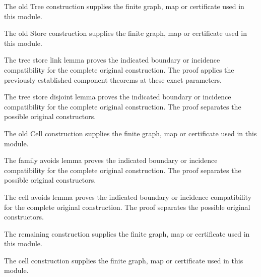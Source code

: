 The old Tree construction supplies the finite graph, map or certificate used in this module.
\par{}

The old Store construction supplies the finite graph, map or certificate used in this module.
\par{}

The tree store link lemma proves the indicated boundary or incidence compatibility for the complete original construction.
The proof applies the previously established component theorems at these exact parameters.
\par{}

The tree store disjoint lemma proves the indicated boundary or incidence compatibility for the complete original construction.
The proof separates the possible original constructors.
\par{}

The old Cell construction supplies the finite graph, map or certificate used in this module.
\par{}

The family avoids lemma proves the indicated boundary or incidence compatibility for the complete original construction.
The proof separates the possible original constructors.
\par{}

The cell avoids lemma proves the indicated boundary or incidence compatibility for the complete original construction.
The proof separates the possible original constructors.
\par{}

The remaining construction supplies the finite graph, map or certificate used in this module.
\par{}

The cell construction supplies the finite graph, map or certificate used in this module.
\par{}

